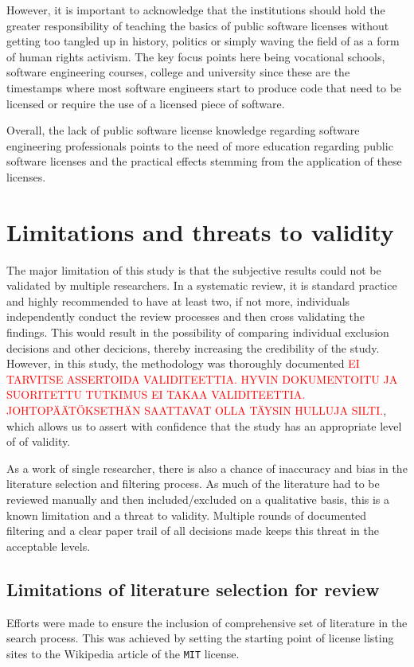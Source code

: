 However, it is important to acknowledge that the institutions should hold the greater responsibility of teaching the basics of public software licenses without getting too tangled up in history, politics or simply waving the field of as a form of human rights activism. The key focus points here being vocational schools, software engineering courses, college and university since these are the timestamps where most software engineers start to produce code that need to be licensed or require the use of a licensed piece of software.

Overall, the lack of public software license knowledge regarding software engineering professionals points to the need of more education regarding public software licenses and the practical effects stemming from the application of these licenses.

\section{Limitations and threats to validity}
The major limitation of this study is that the subjective results could not be validated by multiple researchers. In a systematic review, it is standard practice and highly recommended to have at least two, if not more, individuals independently conduct the review processes and then cross validating the findings. This would result in the possibility of comparing individual exclusion decisions and other decicions, thereby increasing the credibility of the study. However, in this study, the methodology was thoroughly documented \textcolor{red}{EI TARVITSE ASSERTOIDA VALIDITEETTIA. HYVIN DOKUMENTOITU JA SUORITETTU TUTKIMUS EI TAKAA VALIDITEETTIA. JOHTOPÄÄTÖKSETHÄN SAATTAVAT OLLA TÄYSIN HULLUJA SILTI.}, which allows us to assert with confidence that the study has an appropriate level of of validity.

As a work of single researcher, there is also a chance of inaccuracy and bias in the literature selection and filtering process. As much of the literature had to be reviewed manually and then included/excluded on a qualitative basis, this is a known limitation and a threat to validity. Multiple rounds of documented filtering and a clear paper trail of all decisions made keeps this threat in the acceptable levels.

\subsection{Limitations of literature selection for review}
Efforts were made to ensure the inclusion of comprehensive set of literature in the search process. This was achieved by setting the starting point of license listing sites to the Wikipedia article of the \texttt{MIT} license.

